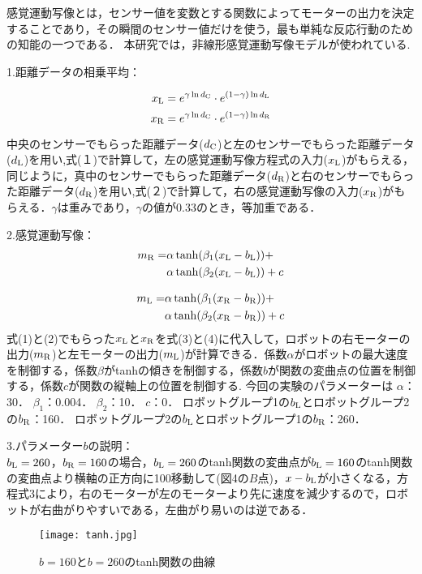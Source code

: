 感覚運動写像とは，センサー値を変数とする関数によってモーターの出力を決定することであり，その瞬間のセンサー値だけを使う，最も単純な反応行動のための知能の一つである．
本研究では，非線形感覚運動写像モデルが使われている.

1.距離データの相乗平均：

\begin{equation}
  x_{\rm L} = e^{\gamma \ln d_{\rm C}} \cdot e^{(1-\gamma)\ln d_{\rm L}} 
\end{equation}
\begin{equation}
  x_{\rm R} = e^{\gamma \ln d_{\rm C}} \cdot e^{(1-\gamma)\ln d_{\rm R}} 
\end{equation}

中央のセンサーでもらった距離データ($d_{\rm C}$)と左のセンサーでもらった距離データ($d_{\rm L}$)を用い,式(１)で計算して，左の感覚運動写像方程式の入力($x_{\rm L}$)がもらえる，同じように，真中のセンサーでもらった距離データ($d_{\rm R}$)と右のセンサーでもらった距離データ($d_{\rm R}$)を用い,式(２)で計算して，右の感覚運動写像の入力($x_{\rm R}$)がもらえる．$\gamma$は重みであり，$\gamma$の値が0.33のとき，等加重である．

2.感覚運動写像：
\begin{equation}
\begin{aligned}
  m_{\rm R} = &\alpha \tanh(\beta_1(x_{\rm L} - b_{\rm L})) + \\
        &\alpha \tanh(\beta_2(x_{\rm L} - b_{\rm L})) + c
\end{aligned}
\end{equation}

\begin{equation}
\begin{aligned}
  m_{\rm L} = &\alpha \tanh(\beta_1(x_{\rm R} - b_{\rm R})) + \\
        &\alpha \tanh(\beta_2(x_{\rm R} - b_{\rm R})) + c
\end{aligned}
\end{equation}
式(1)と(2)でもらった$x_{\rm L}$と$x_{\rm R}$を式(3)と(4)に代入して，ロボットの右モーターの出力($m_{\rm R}$)と左モーターの出力($m_{\rm L}$)が計算できる．係数$\alpha$がロボットの最大速度を制御する，係数$\beta$が{\rm tanh}の傾きを制御する，係数$b$が関数の変曲点の位置を制御する，係数$c$が関数の縦軸上の位置を制御する. 
今回の実験のパラメーターは
$\alpha$：30．
$\beta_1$：0.004．
$\beta_2$：10．
$c$：0．
ロボットグループ1の$b_{\rm L}$とロボットグループ2の$b_{\rm R}$：160．
ロボットグループ2の$b_{\rm L}$とロボットグループ1の$b_{\rm R}$：260．
   
3.パラメーター$b$の説明：\\
$b_{\rm L}=260$，$b_{\rm R}=160$の場合，$b_{\rm L}=260$のtanh関数の変曲点が$b_{\rm L}=160$のtanh関数の変曲点より横軸の正方向に100移動して(図4の$B$点)，$x-b_{\rm L}$が小さくなる，方程式3により，右のモーターが左のモーターより先に速度を減少するので，ロボットが右曲がりやすいである，左曲がり易いのは逆である．
\begin{figure}[!ht]
    \centering
    \texttt{[image: tanh.jpg]}
    \caption{$b=160$と$b=260$のtanh関数の曲線}
\end{figure}

